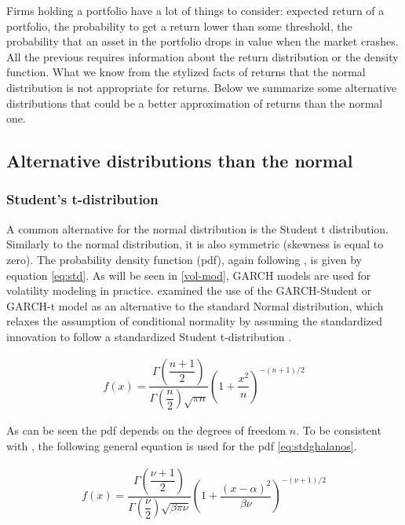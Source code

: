 \documentclass[a4paper, twoside]{templates/ociamthesis}
\begin{document}
Firms holding a portfolio have a lot of things to consider: expected return of a portfolio, the probability to get a return lower than some threshold, the probability that an asset in the portfolio drops in value when the market crashes. All the previous requires information about the return distribution or the density function. What we know from the stylized facts of returns that the normal distribution is not appropriate for returns. Below we summarize some alternative distributions that could be a better approximation of returns than the normal one.

\hypertarget{conditional-distributions}{%
\subsection{Alternative distributions than the normal}\label{conditional-distributions}}

\hypertarget{students-t-distribution}{%
\subsubsection{Student's t-distribution}\label{students-t-distribution}}

A common alternative for the normal distribution is the Student t distribution. Similarly to the normal distribution, it is also symmetric (skewness is equal to zero). The probability density function (pdf), again following \textcite{annaert2021}, is given by equation \eqref{eq:std}. As will be seen in \ref{vol-mod}, GARCH models are used for volatility modeling in practice. \textcite{bollerslev1987} examined the use of the GARCH-Student or GARCH-t model as an alternative to the standard Normal distribution, which relaxes the assumption of conditional normality by assuming the standardized innovation to follow a standardized Student t-distribution \autocite{bollerslev2008}.

\begin{align}
f(x) = \dfrac{\Gamma(\dfrac{n+1}{2})}{\Gamma(\dfrac{n}{2})\sqrt{\pi n}} (1+\dfrac{x^2}{n})^{-(n+1)/2}
 \label{eq:std}
\end{align}

As can be seen the pdf depends on the degrees of freedom \(n\). To be consistent with \textcite{ghalanos2020}, the following general equation is used for the pdf \eqref{eq:stdghalanos}.

\begin{align}
f(x) = \dfrac{\Gamma(\dfrac{\nu+1}{2})}{\Gamma(\dfrac{\nu}{2})\sqrt{\beta \pi \nu}} \left(1+\dfrac{(x-\alpha)^2}{\beta \nu}\right)^{-(\nu+1)/2}
 \label{eq:stdghalanos}
\end{align}
\end{document}
